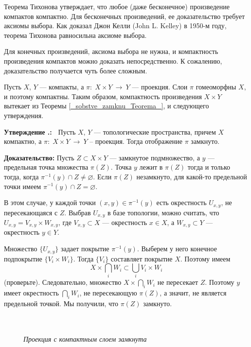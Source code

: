 \documentclass[12pt]{book}
\newcommand{\arrow}{{\:\longrightarrow\:}}
\def\endproof{\hbox{\vrule width 5pt height 5pt depth 0pt}}
\renewcommand{\emptyset}{\varnothing}
\theoremstyle{upshape}
\theoremstyle{generic}
\theoremstyle{upshapenonumber}
\newtheorem{ukazanie}{Указание}[section]
\newcommand{\следствие}{%
     \refstepcounter{teorema}
     {\noindent\bf Следствие \thechapter.\arabic{teorema}:\ }}
\newcommand{\пример}{%
     \refstepcounter{teorema}
     {\noindent\bf Пример \thechapter.\arabic{teorema}:\ }}
\newcommand{\лемма}{%
     \refstepcounter{teorema}
     {\noindent\bf Лемма \thechapter.\arabic{teorema}:\ }}
\newcommand{\теорема}{%
     \refstepcounter{teorema}
     {\noindent\bf Теорема \thechapter.\arabic{teorema}:\ }}
\newcommand{\утверждение}{%
     \refstepcounter{teorema}
     {\noindent\bf Утверждение \thechapter.\arabic{teorema}:\ }}
\def\хфилл{\hfill}
\def\ноиндент{\noindent}
\def\бф{\bf}
\def\указание{\begin{ukazanie}}
\begin{document}
Теорема Тихонова утверждает, что любое (даже бесконечное)
произведение компактов компактно. Для бесконечных
произведений, ее доказательство требует аксиомы выбора.
Как доказал Джон Келли (John L. Kelley) в 1950-м году,
теорема Тихонова равносильна аксиоме выбора.

Для конечных произведений, аксиома выбора не нужна,
и компактность произведения компактов можно доказать
непосредственно. К сожалению, доказательство
получается чуть более сложным.


Пусть $X$, $Y$ --- компакты, а
$\pi:\; X \times Y \arrow Y$ --- проекция.
Слои $\pi$ гомеоморфны $X$, и поэтому компактны.
Таким образом, компактность произведения $X\times Y$
вытекает из Теоремы \ref{_sobstve_zamknu_Teorema_},
и следующего утверждения.

\хфилл

\утверждение\label{_zamk_proe_Predlozhenie_}
Пусть $X$, $Y$ --- топологические пространства,
причем $X$ компактно, а $\pi:\; X \times Y \arrow Y$ --
проекция. Тогда отображение $\pi$ замкнуто.

\хфилл

\ноиндент
{\бф Доказательство:}
Пусть $Z\subset X\times Y$ --- замкнутое подмножество,
а $y$ --- предельная точка множества $\pi(Z)$.
Точка $y$ лежит в $\pi(Z)$ тогда и только тогда, когда
$\pi^{-1}(y)\cap Z\neq\emptyset$.
Если $\pi(Z)$ незамкнуто, для какой-то предельной
точки имеем  $\pi^{-1}(y)\cap Z=\emptyset$.

В этом случае, у каждой точки $(x,y)\in
\pi^{-1}(y)$ есть окрестность $U_{x,y}$, не пересекающаяся с $Z$.
Выбрав $U_{x,y}$ в базе топологии, можно считать, что
$U_{x,y} = V_{x,y} \times W_{x,y}$, где $V_{x,y}\subset X$ --- окрестность
$x\in X$, а $W_{x,y}\subset Y$ --- окрестность $y\in Y$.

Множество $\{U_{x,y}\}$ задает покрытие $\pi^{-1}(y)$.
Выберем у него конечное подпокрытие $\{V_i \times W_i\}$.
Тогда $\{V_i\}$ составляет покрытие $X$. Поэтому имеем
\[ X \times \bigcap_i W_i\subset \bigcup_i V_i \times W_i
\] 
(проверьте). Следовательно, множество $X \times \bigcap_i W_i$ 
не пересекает $Z$. Поэтому $y$ имеет окрестность
$\bigcap_i W_i$, не пересекающую $\pi(Z)$,
а значит, не является предельной точкой.
Мы получили, что $\pi(Z)$ замкнуто. \endproof

\begin{figure}[ht]
\begin{center}\ \\
\\
{\small \em Проекция с компактным слоем замкнута}
\end{center}
\end{figure}
\end{document}
